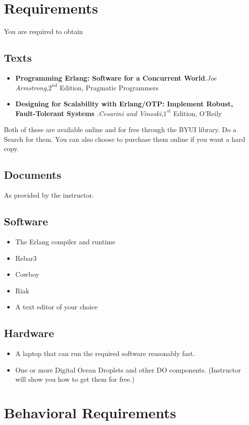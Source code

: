 \documentclass[12pt]{amsart}
\begin{document}
\section{Requirements}
You are required to obtain
\subsection{Texts}
	\begin{itemize}
	\item \textbf{Programming Erlang: Software for a Concurrent World}.\textit{Joe Armstrong},$2^{nd}$ Edition, Pragmatic Programmers
	\item \textbf{Designing for Scalability with Erlang/OTP: Implement Robust, Fault-Tolerant Systems }.\textit{Cesarini and Vinoski},$1^{st}$ Edition, O'Reily
	\end{itemize}
	Both of these are available online and for free through the BYUI library. Do a Search for them. You can also choose to purchase them online if you want a hard copy.
\subsection{Documents} As provided by the instructor.
\subsection{Software}
	\begin{itemize}
		\item The Erlang compiler and runtime
		\item Rebar3
		\item Cowboy
		\item Riak
		\item A text editor of your choice
	\end{itemize}
\subsection{Hardware}
	\begin{itemize}
		\item A laptop that can run the required software reasonably fast.
		\item One or more Digital Ocean Droplets and other DO components. (Instructor will show you how to get them for free.)
	\end{itemize}
\section{Behavioral Requirements}
\end{document}
